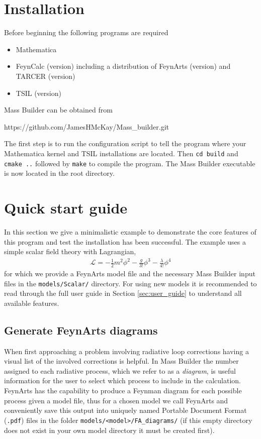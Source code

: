 \section{Installation}

Before beginning the following programs are required
\begin{itemize}
\item Mathematica
\item FeynCalc (version) including a distribution of FeynArts (version) and TARCER (version)
\item TSIL (version)
\end{itemize}



Mass Builder can be obtained from

\begin{lstterm}
https://github.com/JamesHMcKay/Mass_builder.git
\end{lstterm}

The first step is to run the configuration script to tell the program where your Mathematica kernel and TSIL installations are located.  Then \lstinline{cd build} and \lstinline{cmake ..} followed by \lstinline{make} to compile the program.  The Mass Builder executable is now located in the root directory.

\section{Quick start guide}

In this section we give a minimalistic example to demonstrate the core features of this program and test the installation has been successful.  The example uses a simple scalar field theory with Lagrangian,
\begin{align}
\mathcal{L} = -\frac{1}{2}m^2\phi^2 - \frac{g}{3!}\phi^3-\frac{\lambda}{4!}\phi^4
\end{align}
for which we provide a FeynArts model file and the necessary Mass Builder input files in the \lstinline{models/Scalar/} directory.  For using new models it is recommended to read through the full user guide in Section \ref{sec:user_guide} to understand all available features.

\subsection{Generate FeynArts diagrams}\label{generate_diagrams}

When first approaching a problem involving radiative loop corrections having a visual list of the involved corrections is helpful.  In Mass Builder the number assigned to each radiative process, which we refer to as a \textit{diagram}, is useful information for the user to select which process to include in the calculation.  FeynArts has the capability to produce a Feynman diagram for each possible process given a model file, thus for a chosen model we call FeynArts and conveniently save this output into uniquely named Portable Document Format (\lstinline{.pdf}) files in the folder \lstinline{models/<model>/FA_diagrams/} (if this empty directory does not exist in your own model directory it must be created first).

